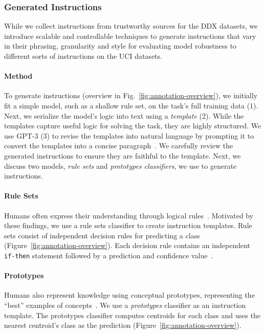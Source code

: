 \subsubsection{Generated Instructions}
\label{subsec:geninstructions}

While we collect instructions from trustworthy sources for the DDX datasets, we introduce scalable and controllable techniques to generate instructions that vary in their phrasing, granularity and style for evaluating model robustness to different sorts of instructions on the UCI datasets.

\paragraph{Method} To generate instructions (overview in Fig.~\ref{fig:annotation-overview}), we initially fit a simple model, such as a shallow rule set, on the task's full training data (1). Next, we serialize the model's logic into text using a \textit{template} (2). While the templates capture useful logic for solving the task, they are highly structured. We use GPT-3 (3) to revise the templates into natural language by prompting it to convert the templates into a concise paragraph~\cite{NEURIPS2020_1457c0d6}. We carefully review the generated instructions to ensure they are faithful to the template. Next, we discuss two models, \textit{rule sets} and \textit{prototypes classifiers}, we use to generate instructions.

\paragraph{Rule Sets} 

Humans often express their understanding through logical rules~\cite{informedMLRueden, pmlr-v80-xu18h,  hu-etal-2016-harnessing}. Motivated by these findings, we use a rule sets classifier to create instruction templates. Rule sets consist of independent decision rules for predicting a class (Figure~\ref{fig:annotation-overview}).
Each decision rule contains an independent \texttt{if-then} statement followed by a prediction and confidence value~\cite{Singh_imodels_a_python_2021}. 

\paragraph{Prototypes} Humans also represent knowledge using conceptual prototypes, representing the ``best'' examples of concepts~\cite{OSHERSON198135, chenthisthat}. We use a \textit{prototypes} classifier as an instruction template. The prototypes classifier computes centroids for each class and uses the nearest centroid's class as the prediction (Figure~\ref{fig:annotation-overview}).

